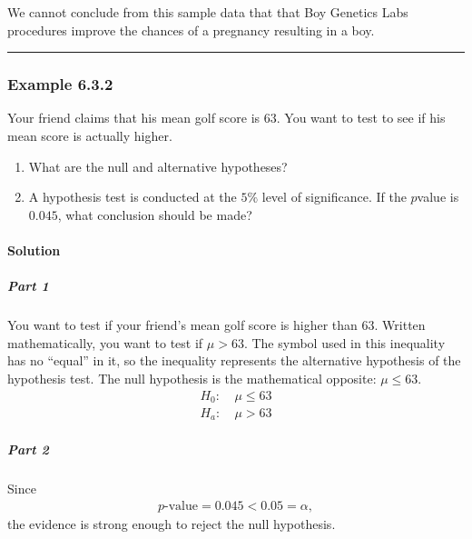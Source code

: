 \documentclass[letterpaper,10pt,english]{jupyterBook}
\begin{document}
\sphinxAtStartPar
We cannot conclude from this sample data that that Boy Genetics Labs procedures improve the chances of a pregnancy resulting in a boy.


\bigskip\hrule\bigskip



\subsubsection{Example 6.3.2}
\label{\detokenize{Ch6 An Introduction to Hypothesis Testing/6.3 Drawing a Conclusion:example-6-3-2}}
\sphinxAtStartPar
Your friend claims that his mean golf score is \(63\). You want to test to see if his mean score is actually higher.
\begin{enumerate}
%
\item {} 
\sphinxAtStartPar
What are the null and alternative hypotheses?

\item {} 
\sphinxAtStartPar
A hypothesis test is conducted at the \(5\%\) level of significance. If the \(p\)\sphinxhyphen{}value is \(0.045\), what conclusion should be made?

\end{enumerate}


\paragraph{Solution}
\label{\detokenize{Ch6 An Introduction to Hypothesis Testing/6.3 Drawing a Conclusion:id2}}

\subparagraph{Part 1}
\label{\detokenize{Ch6 An Introduction to Hypothesis Testing/6.3 Drawing a Conclusion:id3}}
\sphinxAtStartPar
You want to test if your friend’s mean golf score is higher than \(63\). Written mathematically, you want to test if \(\mu > 63\). The symbol used in this inequality has no “equal” in it, so the inequality represents the alternative hypothesis of the hypothesis test. The null hypothesis is the mathematical opposite: \(\mu \leq 63\).
\begin{align*}
H_0:&\ \mu \leq 63 \\
H_a:&\ \mu > 63
\end{align*}

\subparagraph{Part 2}
\label{\detokenize{Ch6 An Introduction to Hypothesis Testing/6.3 Drawing a Conclusion:id4}}
\sphinxAtStartPar
Since
\begin{equation*}
\begin{split}p\text{-value} = 0.045 < 0.05 = \alpha, \end{split}
\end{equation*}
\sphinxAtStartPar
the evidence is strong enough to reject the null hypothesis.
\end{document}
